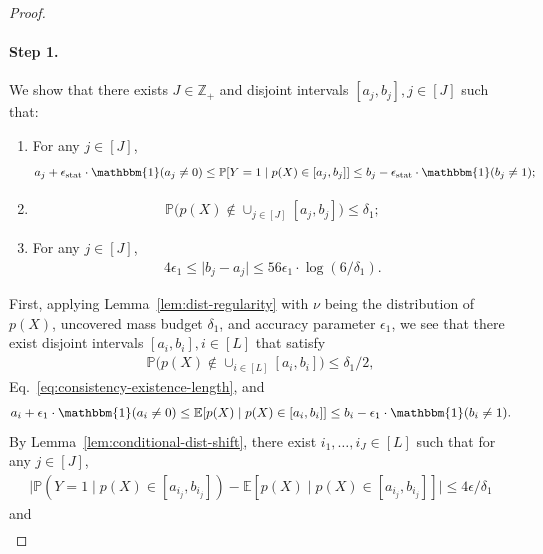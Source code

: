 \documentclass[11pt]{article}
\theoremstyle{statplain}
\theoremstyle{statdefinition}
\newcommand{\stat}{\mathrm{stat}}
\newcommand{\Z}{\mathbb{Z}}
\newcommand{\E}{\mathbb{E}}
\newcommand{\PP}{\mathbb{P}}
\newcommand{\0}{\mathbf{0}}
\newcommand{\estModel}{p} %
\begin{document}
\begin{proof}
\paragraph{Step 1. } 
We show that there exists $J \in \Z_+$ and disjoint intervals $[a_j,b_j], j \in [J]$ such that:
\begin{enumerate}
    \item For any $j \in [J]$, 
    \begin{align}\label{eq:consistency-existence-calibration}
        a_j + \epsilon_\stat \cdot \mathbbm{1}(a_j \neq 0) \leq \PP[Y=1\mid \estModel(X) \in [a_j,b_j]] \leq b_j - \epsilon_\stat \cdot \mathbbm{1}(b_j \neq 1);
    \end{align}
    \item 
    \begin{align}\label{eq:consistency-existence-coverage}
        \PP\Big(\estModel(X) \notin \cup_{j \in [J]} [a_j,b_j]\Big) \leq \delta_1;
    \end{align}
    \item For any $j \in [J]$,
    \begin{align}\label{eq:consistency-existence-length}%
        4\epsilon_1 \leq \Big|b_j - a_j\Big| \leq 56\epsilon_1 \cdot \log(6/\delta_1).
    \end{align}
\end{enumerate}
First, applying Lemma~\ref{lem:dist-regularity} with $\nu$ being the distribution of $\estModel(X)$, uncovered mass budget $\delta_1$, and accuracy parameter $\epsilon_1$, we see that there exist disjoint intervals $[a_i,b_i], i \in [L]$ that satisfy 
\begin{align*}
    \PP\Big(\estModel(X) \notin \cup_{i \in [L]} [a_i,b_i]\Big) \leq \delta_1/2,
\end{align*}
Eq.~\eqref{eq:consistency-existence-length}, and
\begin{align}\label{eq:regularity-pm}
    a_i + \epsilon_1 \cdot \mathbbm{1}(a_i \neq 0) \leq \E[\estModel(X)\mid\estModel(X) \in [a_i,b_i]] \leq b_i - \epsilon_1 \cdot \mathbbm{1}(b_i \neq 1).
\end{align}
By Lemma~\ref{lem:conditional-dist-shift}, there exist $i_1,\dots,i_J \in [L]$ such that for any $j \in [J]$, 
\begin{align}\label{eq:conditional-dist-shift-pm}
    \Big|\PP(Y=1\mid\estModel(X) \in [a_{i_j},b_{i_j}])  - \E[\estModel(X)\mid\estModel(X) \in [a_{i_j},b_{i_j}]] \Big| \leq 4\epsilon/\delta_1 
\end{align}
and
\begin{align*}

\end{align*}
\end{proof}
\end{document}
